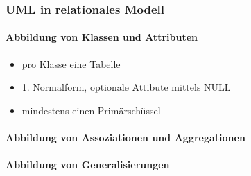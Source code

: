             \subsubsection{UML in relationales Modell}
                \paragraph{Abbildung von Klassen und Attributen}
                    \begin{itemize}
                        \item pro Klasse eine Tabelle
                        \item 1. Normalform, optionale Attibute mittels NULL
                        \item mindestens einen Primärschüssel
                    \end{itemize}
                \paragraph{Abbildung von Assoziationen und Aggregationen}
                \paragraph{Abbildung von Generalisierungen}